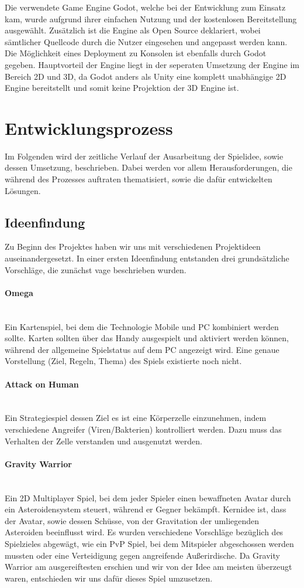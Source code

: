 \documentclass[11pt]{scrartcl}
\newcommand{\lbparagraph}[1]{\paragraph*{#1}\mbox{}\\}
\begin{document}
Die verwendete Game Engine Godot, welche bei der Entwicklung zum Einsatz kam, wurde aufgrund ihrer einfachen Nutzung und der kostenlosen Bereitstellung ausgewählt. Zusätzlich ist die Engine als Open Source deklariert, wobei sämtlicher Quellcode durch die Nutzer eingesehen und angepasst werden kann. Die Möglichkeit eines Deployment zu Konsolen ist ebenfalls durch Godot gegeben. Hauptvorteil der Engine liegt in der seperaten Umsetzung der Engine im Bereich 2D und 3D, da Godot anders als Unity eine komplett unabhängige 2D Engine bereitstellt und somit keine Projektion der 3D Engine ist\cite{G2019}.

\newpage
\section{Entwicklungsprozess}
Im Folgenden wird der zeitliche Verlauf der Ausarbeitung der Spielidee, sowie dessen Umsetzung, beschrieben. Dabei werden vor allem Herausforderungen, die während des Prozesses auftraten thematisiert, sowie die dafür entwickelten Lösungen.
\subsection{Ideenfindung}
Zu Beginn des Projektes haben wir uns mit verschiedenen Projektideen auseinandergesetzt. In einer ersten Ideenfindung entstanden drei grundsätzliche Vorschläge, die zunächst vage beschrieben wurden.

\lbparagraph{Omega}
Ein Kartenspiel, bei dem die Technologie Mobile und PC kombiniert werden sollte. Karten sollten über das Handy ausgespielt und aktiviert werden können, während der allgemeine Spielstatus auf dem PC angezeigt wird. Eine genaue Vorstellung (Ziel, Regeln, Thema) des Spiels existierte noch nicht.
\lbparagraph{Attack on Human}
Ein Strategiespiel dessen Ziel es ist eine Körperzelle einzunehmen, indem verschiedene Angreifer (Viren/Bakterien) kontrolliert werden. Dazu muss das Verhalten der Zelle verstanden und ausgenutzt werden.

\lbparagraph{Gravity Warrior}
Ein 2D Multiplayer Spiel, bei dem jeder Spieler einen bewaffneten Avatar durch ein Asteroidensystem steuert, während er Gegner bekämpft. Kernidee ist, dass der Avatar, sowie dessen Schüsse, von der Gravitation der umliegenden Asteroiden beeinflusst wird.
Es wurden verschiedene Vorschläge bezüglich des Spielzieles abgewägt, wie ein PvP Spiel, bei dem Mitspieler abgeschossen werden mussten oder eine Verteidigung gegen angreifende Außerirdische. Da Gravity Warrior am ausgereiftesten erschien und wir von der Idee am meisten überzeugt waren, entschieden wir uns dafür dieses Spiel umzusetzen.
\end{document}
